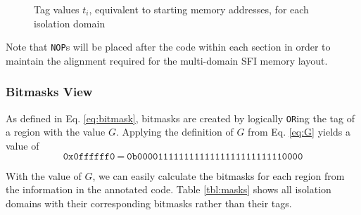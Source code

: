 \documentclass[12pt]{article}
\begin{document}
\begin{figure}[p]
\begin{drawstack}[scale=0.75]
	\footnotesize
	\startframe
		 
	\startframe
		 
	\startframe
		 
	\startframe
		 
	\startframe
		 
\end{drawstack}
\caption{Tag values $t_i$, equivalent to starting memory addresses, for each isolation domain} \label{domains_mem}
\end{figure}

Note that \texttt{NOP}s will be placed after the code within each section in order to maintain the alignment required for the multi-domain SFI memory layout.

\subsubsection{Bitmasks View}

As defined in Eq.  \ref{eq:bitmask}, bitmasks are created by logically \texttt{OR}ing the tag of a region with the value $G$. Applying the definition of $G$ from Eq. \ref{eq:G} yields a value of
$$ \texttt{0x0ffffff0}\ =\ \texttt{0b00001111111111111111111111110000} $$

With the value of $G$, we can easily calculate the bitmasks for each region from the information in the annotated code. Table \ref{tbl:masks} shows all isolation domains with their corresponding bitmasks rather than their tags.
\end{document}
